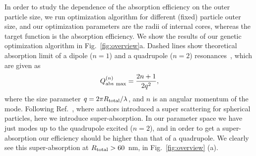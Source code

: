 \documentclass[aps,prl,twocolumn,showpacs,superscriptaddress,groupedaddress]{revtex4-1}
\begin{document}
\begin{figure}
\end{figure}
%
In order to study the dependence of the absorption efficiency on the
outer particle size, we run optimization algorithm for different
(fixed) particle outer size, and our optimization parameters are the
radii of internal cores, whereas the target function is the absorption
efficiency.  We show the results of our genetic optimization algorithm
in Fig.~\ref{fig:overview}a.  Dashed lines show theoretical absorption
limit of a dipole ($n=1$) and a quadrupole ($n=2$)
resonances~\cite{Tribelsky-2011}, which are given as $$Q^{(n)}_{\rm
  abs\ max}=\frac{2n+1}{2q^2},$$ where the size parameter $q=2\pi
R_{\rm total}/\lambda$, and $n$ is an angular momentum of the
mode. Following Ref.~\cite{Fan-2011}, where authors introduced a super
scattering for spherical particles, here we introduce
super-absorption. In our parameter space we have just modes up to the
quadrupole excited ($n=2$), and in order to get a super-absorption our
efficiency should be higher than that of a quadrupole. We clearly see
this super-absorption at $R_{\rm total}>60$~nm, in
Fig.~\ref{fig:overview} (a).
\end{document}
